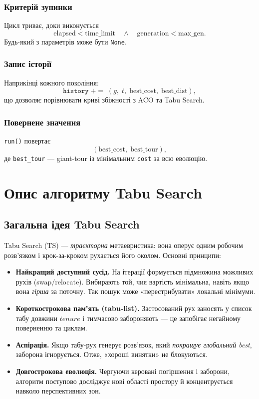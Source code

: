 \documentclass[12pt,a4paper]{article}
\begin{document}
\subsubsection{Критерій зупинки}
Цикл триває, доки виконується
\[
\text{elapsed} < \text{time\_limit}
\quad\land\quad
\text{generation} < \text{max\_gen}.
\]
Будь-який з параметрів може бути \texttt{None}.

\subsubsection{Запис історії}
Наприкінці кожного покоління:
\[
\texttt{history}\; \mathrel{+\!=}\;
(g,\;t,\;\text{best\_cost},\;\text{best\_dist}),
\]
що дозволяє порівнювати криві збіжності з ACO та Tabu Search.

\subsubsection{Повернене значення}
\texttt{run()} повертає
\[
(\text{best\_cost},\;\text{best\_tour}),
\]
де \texttt{best\_tour} — giant-tour із мінімальним \texttt{cost}
за всю еволюцію.

\section{Опис алгоритму Tabu Search}
\subsection{Загальна ідея Tabu Search}
Tabu Search (TS) — \emph{траєкторна} метаевристика: вона оперує
одним робочим розв’язком і крок-за-кроком рухається його околом.
Основні принципи:

\begin{itemize}
  \item \textbf{Найкращий доступний сусід.}  
        На ітерації формується підмножина можливих рухів
        (swap/relocate). Вибирають той, чия вартість мінімальна,
        навіть якщо вона \emph{гірша} за поточну.  
        Так пошук може «перестрибувати» локальні мінімуми.
  \item \textbf{Короткострокова памʼять (tabu-list).}  
        Застосований рух заносять у список табу довжини
        $\textit{tenure}$ і тимчасово забороняють —  
        це запобігає негайному поверненню та циклам.
  \item \textbf{Аспірація.}  
        Якщо табу-рух генерує розв’язок, який
        \emph{покращує глобальний best}, заборона ігнорується.
        Отже, «хороші винятки» не блокуються.
  \item \textbf{Довгострокова еволюція.}  
        Чергуючи керовані погіршення і заборони,
        алгоритм поступово досліджує нові області простору
        й концентрується навколо перспективних зон.
\end{itemize}
\end{document}
